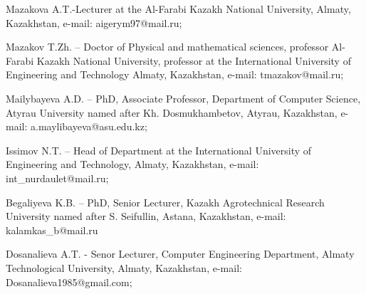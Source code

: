 \begin{authorinfo}
Mazakova A.T.-Lecturer at the Al-Farabi Kazakh National University,
Almaty, Kazakhstan, e-mail: aigerym97@mail.ru;

Mazakov T.Zh. -- Doctor of Physical and mathematical sciences, professor
Al-Farabi Kazakh National University, professor at the International
University of Engineering and Technology Almaty, Kazakhstan, e-mail:
tmazakov@mail.ru;

Mailybayeva A.D. -- PhD, Associate Professor, Department of Computer
Science, Atyrau University named after Kh. Dosmukhambetov, Atyrau,
Kazakhstan, e-mail: a.maylibayeva@asu.edu.kz;

Issimov N.T. -- Head of Department at the International University of
Engineering and Technology, Almaty, Kazakhstan, e-mail:
int\_nurdaulet@mail.ru;

Begaliyeva K.B. -- PhD, Senior Lecturer, Kazakh Agrotechnical Research
University named after S. Seifullin, Astana, Kazakhstan, e-mail:
kalamkas\_b@mail.ru

Dosanalieva A.T. - Senor Lecturer, Computer Engineering Department,
Almaty Technological University, Almaty, Kazakhstan, e-mail:
Dosanalieva1985@gmail.com;
\end{authorinfo}
